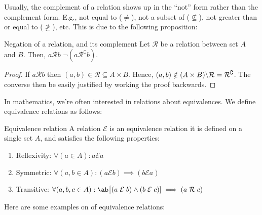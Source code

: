 Usually, the complement of a relation shows up in the \enquote{not} form rather than the complement
form. E.g., not equal to (\(\neq\)), not a subset of (\(\nsubseteq\)), not greater than or equal to
(\(\ngeq\)), etc. This is due to the following proposition:

\begin{prop}{Negation of a relation, and its complement}{}
  Let \(\mathcal{R}\) be a relation between set \(A\) and \(B\). Then, \(a \mathrel{\mathcal{R}} b\)
  \ifft \(\neg (a \mathrel{\mathcal{R}^{\complement}} b)\).
\end{prop}

\begin{proof}
  If \(a \mathrel{\mathcal{R}} b\) then \((a, b) \in \mathcal{R} \subseteq A \times B\). Hence,
  \((a, b) \notin (A \times B) \backslash \mathcal{R} = \mathcal{R}^{\complement}\). The converse then be
  easily justified by working the proof backwards.
\end{proof}

In mathematics, we're often interested in relations about equivalences. We define equivalence
relations as follows:

\begin{df}{Equivalence relation}{}
  A relation \(\mathcal{E}\) is an equivalence relation \ifft it is defined on a single set \(A\),
  and satisfies the following properties:
  \begin{enumerate}[noitemsep]
    \item Reflexivity: \(\forall (a \in A) : a \mathrel{\mathcal{E}} a\)
    \item Symmetric:
          \(\forall (a, b \in A): (a \mathrel{\mathcal{E}} b) \implies (b \mathrel{\mathcal{E}} a)\)
    \item Transitive:
          \(\forall(a, b, c \in A): \ab\big[(a \mathrel{\mathcal{E}} b) \land (b \mathrel{\mathcal{E}} c)] \implies (a \mathrel{\mathcal{R}} c)\)
  \end{enumerate}
\end{df}

Here are some examples on of equivalence relations:

